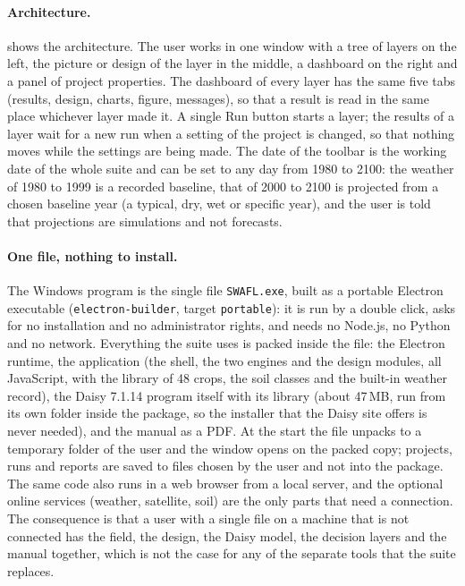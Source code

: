 \documentclass[preprint,12pt]{elsarticle}
\begin{document}
\paragraph{Architecture.}
 shows the architecture. The user works in one window with a tree of layers on the left, the picture or design of the layer in the middle, a dashboard on the right and a panel of project properties. The dashboard of every layer has the same five tabs (results, design, charts, figure, messages), so that a result is read in the same place whichever layer made it. A single Run button starts a layer; the results of a layer wait for a new run when a setting of the project is changed, so that nothing moves while the settings are being made. The date of the toolbar is the working date of the whole suite and can be set to any day from 1980 to 2100: the weather of 1980 to 1999 is a recorded baseline, that of 2000 to 2100 is projected from a chosen baseline year (a typical, dry, wet or specific year), and the user is told that projections are simulations and not forecasts.

\paragraph{One file, nothing to install.}
The Windows program is the single file \texttt{SWAFL.exe}, built as a portable Electron executable (\texttt{electron-builder}, target \texttt{portable}): it is run by a double click, asks for no installation and no administrator rights, and needs no Node.js, no Python and no network. Everything the suite uses is packed inside the file: the Electron runtime, the application (the shell, the two engines and the design modules, all JavaScript, with the library of 48 crops, the soil classes and the built-in weather record), the Daisy 7.1.14 program itself with its library (about 47\,MB, run from its own folder inside the package, so the installer that the Daisy site offers is never needed), and the manual as a PDF. At the start the file unpacks to a temporary folder of the user and the window opens on the packed copy; projects, runs and reports are saved to files chosen by the user and not into the package. The same code also runs in a web browser from a local server, and the optional online services (weather, satellite, soil) are the only parts that need a connection. The consequence is that a user with a single file on a machine that is not connected has the field, the design, the Daisy model, the decision layers and the manual together, which is not the case for any of the separate tools that the suite replaces.
\end{document}

